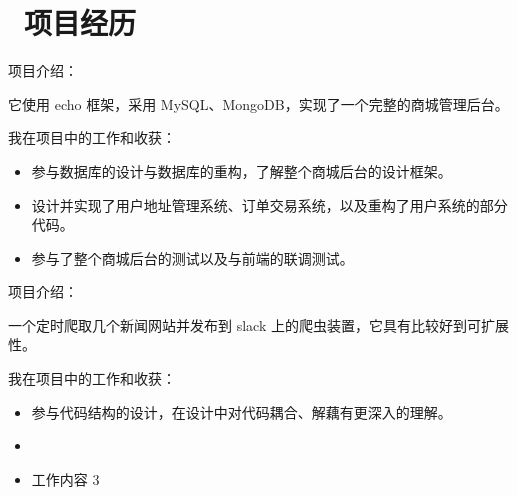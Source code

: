 \documentclass{resume}
\begin{document}
\section{\faUsers\ 项目经历} \vspace{1mm}
\faLink {}

\vspace{1mm} \par
\noindent
项目介绍：

\vspace{1mm}\par
\setlength{\parindent}{2ex}
它使用 echo 框架，采用 MySQL、MongoDB，实现了一个完整的商城管理后台。

\vspace{1mm}\par
\noindent
我在项目中的工作和收获：

\begin{itemize}[parsep=1ex]
  \item 参与数据库的设计与数据库的重构，了解整个商城后台的设计框架。
  \item 设计并实现了用户地址管理系统、订单交易系统，以及重构了用户系统的部分代码。
  \item 参与了整个商城后台的测试以及与前端的联调测试。
\end{itemize} \vspace{1mm}


\vspace{1mm}\par
\noindent
项目介绍：

\vspace{1mm}\par
\setlength{\parindent}{2ex}
一个定时爬取几个新闻网站并发布到 slack 上的爬虫装置，它具有比较好到可扩展性。

\vspace{1mm}\par
\noindent
我在项目中的工作和收获：

\begin{itemize}[parsep=1ex]
  \item 参与代码结构的设计，在设计中对代码耦合、解藕有更深入的理解。
  \item 
  \item 工作内容 3
\end{itemize}
\end{document}
